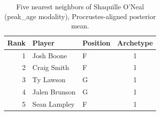 \begin{table}[htbp]
  \centering\small
  \begin{tabular}{rllc}
    \toprule
    Rank & Player & Position & Archetype \\
    \midrule
    1 & Josh Boone & F & 1 \\
    2 & Craig Smith & F & 1 \\
    3 & Ty Lawson & G & 1 \\
    4 & Jalen Brunson & G & 1 \\
    5 & Sean Lampley & F & 1 \\
    \bottomrule
  \end{tabular}
  \caption{Five nearest neighbors of Shaquille O'Neal (peak_age modality), Procrustes-aligned posterior mean.}
  \label{tab:Shaquille_O_Neal_neighbors_peak_age}
\end{table}

